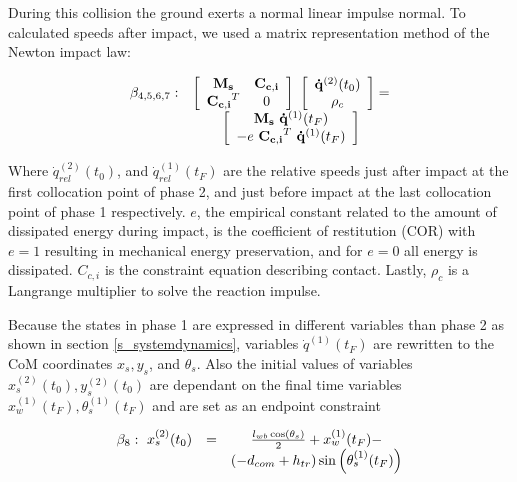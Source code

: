 \documentclass[default,iicol]{sn-jnl}
\begin{document}
{During this collision the ground exerts a normal linear impulse normal. To calculated speeds after impact, we used a matrix representation method of the Newton impact law\cite{vallery_heike_advanced_2018}:

\begin{equation}
\begin{array}{l c}
    \beta_{4,5,6,7}: & \left[\begin{array}{cc}
        \mathbf{M_s} & \mathbf{C_{c,i}} \\
        \mathbf{C_{c,i}}^T & 0
    \end{array} \right]\
    \left[\begin{array}{c}
       \mathbf{\dot q}^{(2)}(t_0)  \\
        \rho_c 
    \end{array}\right] =
     \\ &  
     \left[\begin{array}{c}
         \mathbf{M_s}\ \mathbf{\dot q}^{(1)}(t_F)   \\
         -e\ \mathbf{C_{c,i}}^T\ \mathbf{\dot q}^{(1)}(t_F)
    \end{array}\right]
    \end{array}
\end{equation}

Where $\dot q_{rel}^{(2)}(t_0)$, and $\dot q_{rel}^{(1)}(t_F)$ are the relative speeds just after impact at the first collocation point of phase 2, and just before impact at the last collocation point of phase 1 respectively.  $e$, the empirical constant related to the amount of dissipated energy during impact, is the coefficient of restitution (COR) with $e=1$ resulting in mechanical energy preservation, and for $e=0$ all energy is dissipated. $C_{c,i}$ is the constraint equation describing contact. Lastly, $\rho_c$ is a Langrange multiplier to solve the reaction impulse.

Because the states in phase 1 are expressed in different variables than phase 2 as shown in section \ref{s_systemdynamics}, variables $\dot q^{(1)}(t_F)$ are rewritten to the CoM coordinates $x_s,y_s$, and $\theta_s$. Also the initial values of variables $x_s^{(2)}(t_0), y_s^{(2)}(t_0)$ are dependant on the final time variables $x_w^{(1)}(t_F), \theta_s^{(1)}(t_F)$ and are set as an endpoint constraint

\begin{equation}
\begin{array}{l c c}
\beta_8: \ x_s^{(2)}(t_0) & = & \frac{l_{w b} \cos \left(\theta_s\right)}{2}+x_w^{(1)}(t_F)- \\ 
& & \left(-d_{c o m}+h_{t r}\right) \sin \left(\theta_s^{(1)}(t_F)\right) \\


\end{array}
\end{equation}}
\end{document}
